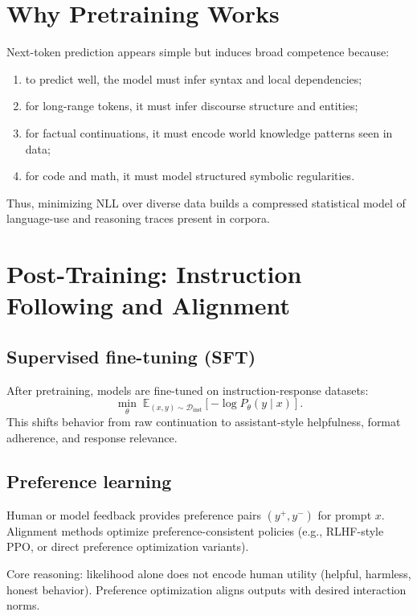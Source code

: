 \documentclass[12pt]{article}
\begin{document}
\section{Why Pretraining Works}

Next-token prediction appears simple but induces broad competence because:
\begin{enumerate}
    \item to predict well, the model must infer syntax and local dependencies;
    \item for long-range tokens, it must infer discourse structure and entities;
    \item for factual continuations, it must encode world knowledge patterns seen in data;
    \item for code and math, it must model structured symbolic regularities.
\end{enumerate}
Thus, minimizing NLL over diverse data builds a compressed statistical model of language-use and reasoning traces present in corpora.

\section{Post-Training: Instruction Following and Alignment}

\subsection{Supervised fine-tuning (SFT)}

After pretraining, models are fine-tuned on instruction-response datasets:
\[
\min_\theta \; \mathbb{E}_{(x,y)\sim\mathcal{D}_{\text{inst}}}\left[-\log P_\theta(y\mid x)\right].
\]
This shifts behavior from raw continuation to assistant-style helpfulness, format adherence, and response relevance.

\subsection{Preference learning}

Human or model feedback provides preference pairs \((y^+,y^-)\) for prompt \(x\). Alignment methods optimize preference-consistent policies (e.g., RLHF-style PPO, or direct preference optimization variants).

Core reasoning: likelihood alone does not encode human utility (helpful, harmless, honest behavior). Preference optimization aligns outputs with desired interaction norms.
\end{document}
